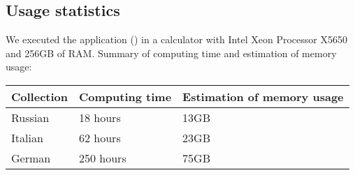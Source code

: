 
    \subsection{Usage statistics}
        We executed the application () in a calculator with Intel\textsuperscript{\textregistered} Xeon\textsuperscript{\textregistered} Processor X5650 and 256GB of RAM. Summary of computing time and estimation of memory usage:
        \begin{center}
			\begin{tabular}[H]{| p{} | p{} | p{} |}
                \hline
                Collection  & Computing time    & Estimation of memory usage \\ \hline\hline
				Russian     & 18 hours          & 13GB                       \\ \hline
                Italian     & 62 hours          & 23GB                       \\ \hline
                German      & 250 hours         & 75GB                       \\ \hline %
			\end{tabular}
        \end{center}